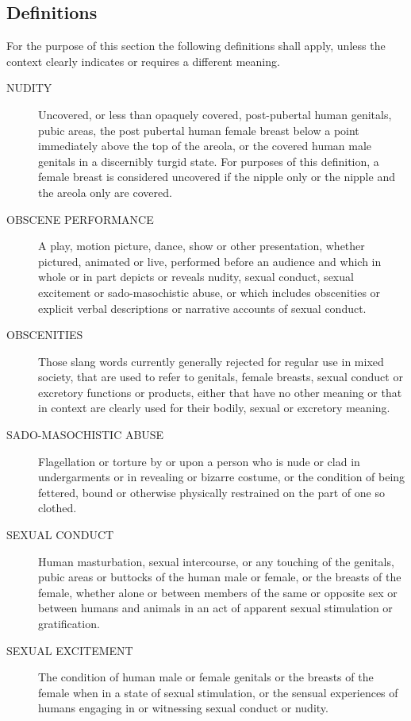 \subsection{Definitions}
For the purpose of this section the following definitions shall apply, unless the context clearly indicates or requires a different meaning.
\begin{description}
    \item[NUDITY] Uncovered, or less than opaquely covered, post-pubertal human genitals, pubic areas, the post pubertal human female breast below a point immediately above the top of the areola, or the covered human male genitals in a discernibly turgid state.  For purposes of this definition, a female breast is considered uncovered if the nipple only or the nipple and the areola only are covered.
    \item[OBSCENE PERFORMANCE] A play, motion picture, dance, show or other presentation, whether pictured, animated or live, performed before an audience and which in whole or in part depicts or reveals nudity, sexual conduct, sexual excitement or sado-masochistic abuse, or which includes obscenities or explicit verbal descriptions or narrative accounts of sexual conduct.
    \item[OBSCENITIES] Those slang words currently generally rejected for regular use in mixed society, that are used to refer to genitals, female breasts, sexual conduct or excretory functions or products, either that have no other meaning or that in context are clearly used for their bodily, sexual or excretory meaning.
    \item[SADO-MASOCHISTIC ABUSE] Flagellation or torture by or upon a person who is nude or clad in undergarments or in revealing or bizarre costume, or the condition of being fettered, bound or otherwise physically restrained on the part of one so clothed.
    \item[SEXUAL CONDUCT] Human masturbation, sexual intercourse, or any touching of the genitals, pubic areas or buttocks of the human male or female, or the breasts of the female, whether alone or between members of the same or opposite sex or between humans and animals in an act of apparent sexual stimulation or gratification.
    \item[SEXUAL EXCITEMENT] The condition of human male or female genitals or the breasts of the female when in a state of sexual stimulation, or the sensual experiences of humans engaging in or witnessing sexual conduct or nudity.
\end{description}
